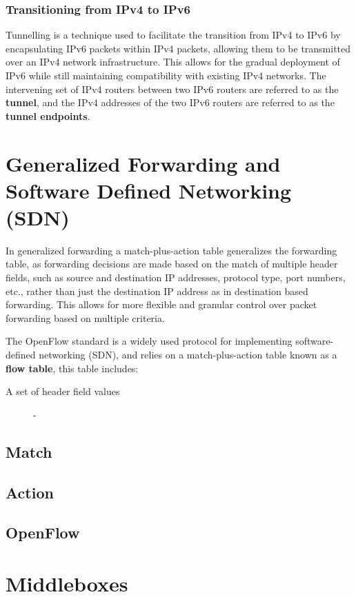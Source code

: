 \documentclass[12pt letter]{report}
\begin{document}
\subsection{Transitioning from IPv4 to IPv6}

Tunnelling is a technique used to facilitate the transition from IPv4
to IPv6 by encapsulating IPv6 packets within IPv4 packets, allowing
them to be transmitted over an IPv4 network infrastructure. This
allows for the gradual deployment of IPv6 while still maintaining
compatibility with existing IPv4 networks. The intervening set of
IPv4 routers between two IPv6 routers are referred to as the
\textbf{tunnel}, and the IPv4 addresses of the two IPv6 routers are
referred to as the \textbf{tunnel endpoints}.

\chapter{Generalized Forwarding and Software Defined Networking (SDN)}

In generalized forwarding a match-plus-action table generalizes the
forwarding table, as forwarding decisions are made based on the
match of multiple header fields, such as source and destination IP
addresses, protocol type, port numbers, etc., rather than just the
destination IP address as in destination based forwarding. This
allows for more flexible and granular control over packet forwarding
based on multiple criteria.

The OpenFlow standard is a widely used protocol for implementing
software-defined networking (SDN), and relies on a match-plus-action
table known as a \textbf{flow table}, this table includes:
\begin{description}
  \item[A set of header field values] -
\end{description}

\section{Match}

\section{Action}

\section{OpenFlow}

\chapter{Middleboxes}
\end{document}
